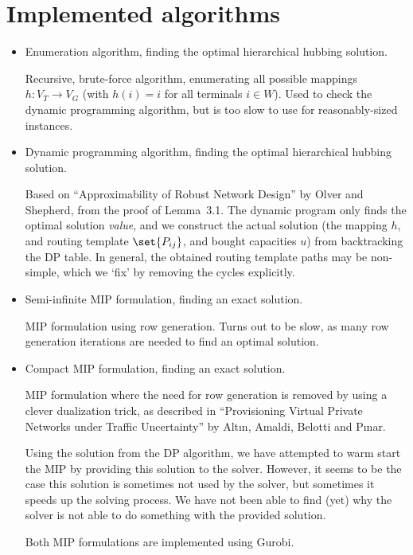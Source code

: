 \documentclass[11pt]{article}
\begin{document}
    \section{Implemented algorithms}
    \begin{itemize}
        \item Enumeration algorithm, finding the optimal hierarchical hubbing solution.

        Recursive, brute-force algorithm, enumerating all possible mappings $h\colon V_T \to V_G$ (with $h(i) = i$ for all terminals $i \in W$).
        Used to check the dynamic programming algorithm, but is too slow to use for reasonably-sized instances.

        \item Dynamic programming algorithm, finding the optimal hierarchical hubbing solution.

        Based on ``Approximability of Robust Network Design'' by Olver and Shepherd, from the proof of Lemma~3.1.
        The dynamic program only finds the optimal solution \emph{value}, and we construct the actual solution (the mapping $h$, and routing template $\set{P_{ij}}$, and bought capacities $u$) from backtracking the DP table.
        In general, the obtained routing template paths may be non-simple, which we `fix' by removing the cycles explicitly.

        \item Semi-infinite MIP formulation, finding an exact solution.

        MIP formulation using row generation.
        Turns out to be slow, as many row generation iterations are needed to find an optimal solution.

        \item Compact MIP formulation, finding an exact solution.

        MIP formulation where the need for row generation is removed by using a clever dualization trick, as described in ``Provisioning Virtual Private Networks under Traffic Uncertainty'' by Alt\i{}n, Amaldi, Belotti and P\i{}nar.

        Using the solution from the DP algorithm, we have attempted to warm start the MIP by providing this solution to the solver.
        However, it seems to be the case this solution is sometimes not used by the solver, but sometimes it speeds up the solving process.
        We have not been able to find (yet) why the solver is not able to do something with the provided solution.

        Both MIP formulations are implemented using Gurobi.
    \end{itemize}
\end{document}
